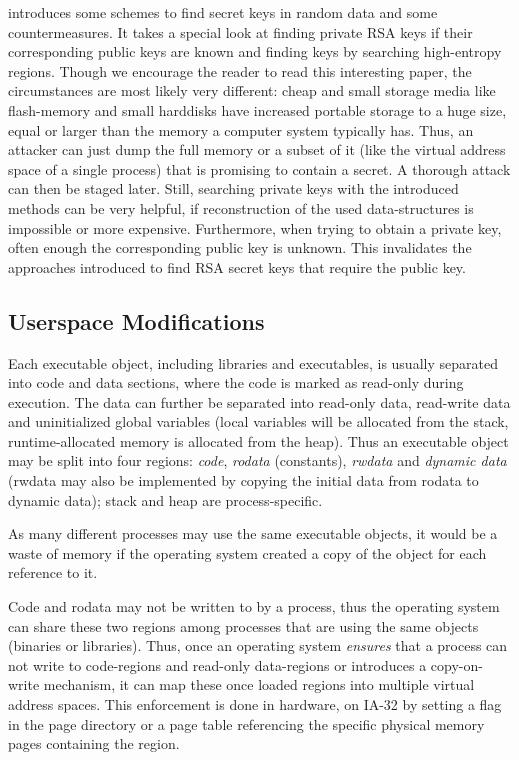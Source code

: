 \cite{hide_n_seek:1998} introduces some schemes to find secret keys in random
data and some countermeasures. It takes a special look at finding private RSA
keys if their corresponding public keys are known and finding keys by searching
high-entropy regions. Though we encourage the reader to read this interesting
paper, the circumstances are most likely very different: cheap and small storage
media like flash-memory and small harddisks have increased portable storage to a
huge size, equal or larger than the memory a computer system typically has.
Thus, an attacker can just dump the full memory or a subset of it (like the
virtual address space of a single process) that is promising to contain a
secret. A thorough attack can then be staged later.  Still, searching private
keys with the introduced methods can be very helpful, if reconstruction of the
used data-structures is impossible or more expensive. Furthermore, when trying
to obtain a private key, often enough the corresponding public key is unknown.
This invalidates the approaches introduced to find RSA secret keys that require
the public key.




\subsection{Userspace Modifications}

\label{userspace_attacks}

Each executable object, including libraries and executables, is usually
separated into code and data sections, where the code is marked as read-only
during execution. The data can further be separated into read-only data,
read-write data and uninitialized global variables (local variables will be
allocated from the stack, runtime-allocated memory is allocated from the heap).
Thus an executable object may be split into four regions: \emph{code},
\emph{rodata} (constants), \emph{rwdata} and \emph{dynamic data} (rwdata may
also be implemented by copying the initial data from rodata to dynamic data);
stack and heap are process-specific.

As many different processes may use the same executable objects, it would be a
waste of memory if the operating system created a copy of the object for each
reference to it.

Code and rodata may not be written to by a process, thus the operating system
can share these two regions among processes that are using the same objects
(binaries or libraries).  Thus, once an operating system \emph{ensures} that a
process can not write to code-regions and read-only data-regions or introduces a
copy-on-write mechanism, it can map these once loaded regions into multiple
virtual address spaces.  This enforcement is done in hardware, on IA-32 by
setting a flag in the page directory or a page table referencing the specific
physical memory pages containing the region.

